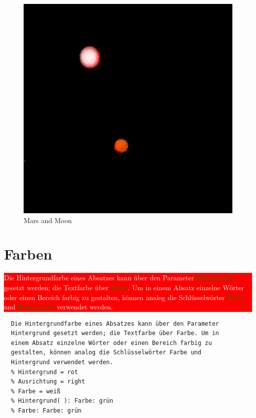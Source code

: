 \documentclass{scrartcl}
\begin{document}
\begin{figure}[hbt]
\includegraphics[height=.40\textheight]{Image.png}
\caption{Mars and Moon}
\label{bild1}
\end{figure}


\section{Farben}

\colorbox{red}{\parbox{\linewidth}{%
\textcolor{white}{%
{\raggedleft%
Die Hintergrundfarbe eines Absatzes kann über den Parameter
\textcolor{green}{Hintergrund} gesetzt werden; die Textfarbe über \textcolor{green}{Farbe}. Um in
einem Absatz einzelne Wörter oder einen Bereich farbig zu
gestalten, können analog die Schlüsselwörter \textcolor{green}{Farbe} und
\textcolor{green}{Hintergrund} verwendet werden.
\\}
}
}
}

\begin{verbatim}
  Die Hintergrundfarbe eines Absatzes kann über den Parameter
  Hintergrund gesetzt werden; die Textfarbe über Farbe. Um in
  einem Absatz einzelne Wörter oder einen Bereich farbig zu
  gestalten, können analog die Schlüsselwörter Farbe und
  Hintergrund verwendet werden.
  % Hintergrund = rot
  % Ausrichtung = right
  % Farbe = weiß
  % Hintergrund( ): Farbe: grün
  % Farbe: Farbe: grün
\end{verbatim}
\end{document}
